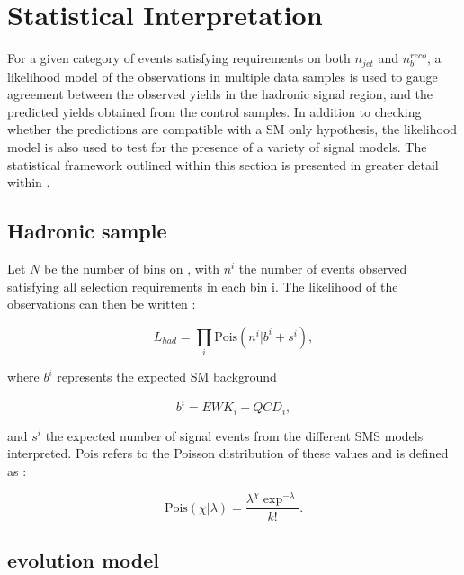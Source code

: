 \section{Statistical Interpretation}
\label{sec:statframework}

For a given category of events satisfying requirements on both $n_{jet}$ and $n_{b}^{reco}$, a likelihood model of the observations in multiple data samples is used to gauge agreement between the observed yields in the hadronic signal region, and the predicted yields obtained from the control samples. In addition to checking whether the predictions are compatible with a \ac{SM} only hypothesis, the likelihood model is also used to test for the presence of a variety of signal models. The statistical framework outlined within this section is presented in greater detail within \cite{Laird:2012mla}.

\subsection{Hadronic sample}

Let $N$ be the number of bins on \theht, with $n^{i}$ the number of events observed satisfying all selection requirements in each \theht bin i. The likelihood of the observations can then be written :

\begin{equation}
L_{had} =   \prod_{i}\text{Pois}(n^{i}\rvert b^{i} + s^{i}),
\end{equation}

where $b^{i}$ represents the expected \ac{SM} background 

\begin{equation}
\label{eq:totbacksum}
b^{i} = EWK_{i} + QCD_{i},
\end{equation}

and $s^{i}$ the expected number of signal events from the different \ac{SMS} models interpreted. Pois refers to the Poisson distribution of these values and is defined as :

\begin{equation}
\text{Pois}(\chi\rvert\lambda) = \frac{\lambda^{\chi}\exp^{-\lambda}}{k!}.
\end{equation}
 
\subsection{\theht evolution model}
\label{subsec:htevolution}

